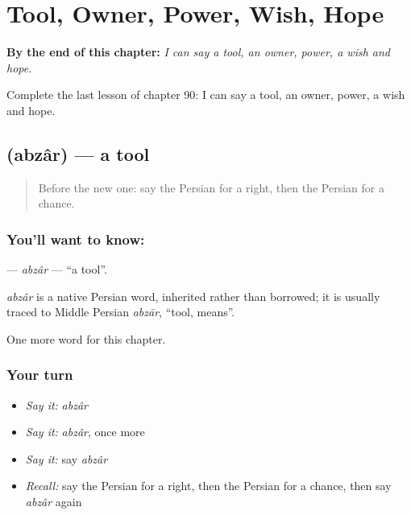 
\chapter{Tool, Owner, Power, Wish, Hope}
\label{ch:fa-tool-owner-power-wish-hope}

\begin{chapteropening}
\textbf{By the end of this chapter:} \emph{I can say a tool, an owner, power, a wish and hope.}

Complete the last lesson of chapter 90: I can say a tool, an owner, power, a wish and hope.
\end{chapteropening}

\section[\texorpdfstring{\fa{ابزار} (abzâr)}{ابزار (abzâr)}]{ (abzâr) — a tool}

\label{lesson:FA-C90-abzar}



\begin{quote}
Before the new one: say the Persian for a right, then the Persian for a chance.
\end{quote}

\subsection*{You'll want to know: }
\textbf{} — \emph{abzâr} — \textquotedblleft{}a tool\textquotedblright{}.

\begin{cousinweb}
\emph{abzâr} is a native Persian word, inherited rather than borrowed; it is usually traced to Middle Persian \emph{abzār}, \textquotedblleft{}tool, means\textquotedblright{}.
\end{cousinweb}

\begin{grammarlens}[title={What you've built}]
One more word for this chapter.
\end{grammarlens}

\subsection*{Your turn}
\begin{itemize}
\raggedright
  \item \emph{Say it:} \emph{abzâr}
  \item \emph{Say it:} \emph{abzâr}, once more
  \item \emph{Say it:} say \emph{abzâr}
  \item \emph{Recall:} say the Persian for a right, then the Persian for a chance, then say \emph{abzâr} again
\end{itemize}

